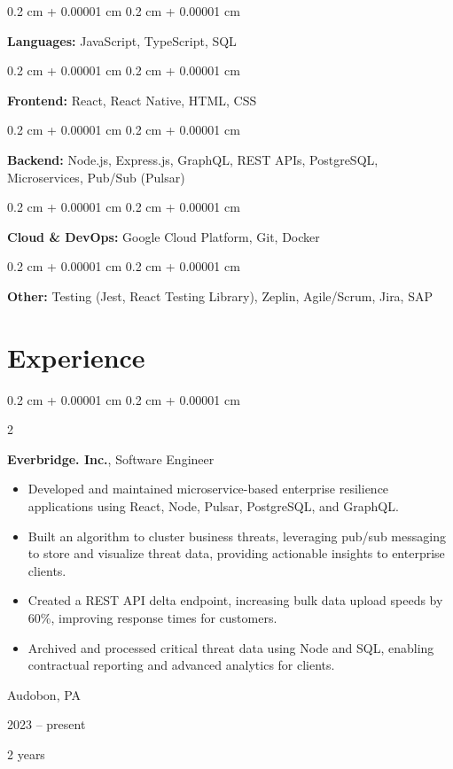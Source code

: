 \documentclass[10pt, letterpaper]{article}
\newenvironment{highlights}{
    \begin{itemize}[
        topsep=0.10 cm,
        parsep=0.08 cm,
        partopsep=0pt,
        itemsep=0pt,
        leftmargin=0.4 cm + 10pt
    ]
}{
    \end{itemize}
} %
\newenvironment{onecolentry}{
    \begin{adjustwidth}{
        0.2 cm + 0.00001 cm
    }{
        0.2 cm + 0.00001 cm
    }
}{
    \end{adjustwidth}
} %
\newenvironment{twocolentry}[2][]{
    \onecolentry
    \def\secondColumn{#2}
    \setcolumnwidth{\fill, 4.5 cm}
    \begin{paracol}{2}
}{
    \switchcolumn \raggedleft \secondColumn
    \end{paracol}
    \endonecolentry
} %
\begin{document}
        
        \begin{onecolentry}
            \textbf{Languages:} JavaScript, TypeScript, SQL
        \end{onecolentry}

        \vspace{0.13 cm}

        \begin{onecolentry}
            \textbf{Frontend:} React, React Native, HTML, CSS
        \end{onecolentry}

        \vspace{0.13 cm}

        \begin{onecolentry}
            \textbf{Backend:} Node.js, Express.js, GraphQL, REST APIs, PostgreSQL, Microservices, Pub/Sub (Pulsar)
        \end{onecolentry}

        \vspace{0.13 cm}

        \begin{onecolentry}
            \textbf{Cloud \& DevOps:} Google Cloud Platform, Git, Docker
        \end{onecolentry}

        \vspace{0.13 cm}

        \begin{onecolentry}
            \textbf{Other:} Testing (Jest, React Testing Library), Zeplin, Agile/Scrum, Jira, SAP
        \end{onecolentry}


    
    \section{Experience}



        
        \begin{twocolentry}{
            Audobon, PA

        2023 – present

        2 years
        }
            \textbf{Everbridge. Inc.}, Software Engineer
            \begin{highlights}
                \item Developed and maintained microservice-based enterprise resilience applications using React, Node, Pulsar, PostgreSQL, and GraphQL.
                \item Built an algorithm to cluster business threats, leveraging pub/sub messaging to store and visualize threat data, providing actionable insights to enterprise clients.
                \item Created a REST API delta endpoint, increasing bulk data upload speeds by 60\%, improving response times for customers.
                \item Archived and processed critical threat data using Node and SQL, enabling contractual reporting and advanced analytics for clients.
            \end{highlights}
        \end{twocolentry}
\end{document}
